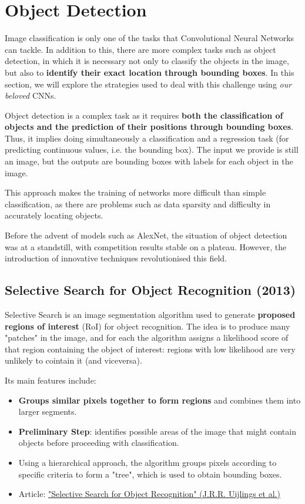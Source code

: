 \section{Object Detection}

Image classification is only one of the tasks that Convolutional Neural Networks can tackle. In addition to this, there are more complex tasks such as object detection, in which it is necessary not only to classify the objects in the image, but also to \textbf{identify their exact location through bounding boxes}. In this section, we will explore the strategies used to deal with this challenge using \textit{our beloved} CNNs.

Object detection is a complex task as it requires \textbf{both the classification of objects and the prediction of their positions through bounding boxes}. Thus, it implies doing simultaneously a classification and a regression task (for predicting continuous values, i.e. the bounding box). The input we provide is still an image, but the outputs are bounding boxes with labels for each object in the image. 

This approach makes the training of networks more difficult than simple classification, as there are problems such as data sparsity and difficulty in accurately locating objects. 

Before the advent of models such as AlexNet, the situation of object detection was at a standstill, with competition results stable on a plateau. However, the introduction of innovative techniques revolutionised this field.

\subsection{Selective Search for Object Recognition (2013)}
Selective Search is an image segmentation algorithm used to generate \textbf{proposed regions of interest} (RoI) for object recognition. The idea is to produce many "patches" in the image, and for each the algorithm assigns a likelihood score of that region containing the object of interest: regions with low likelihood are very unlikely to cointain it (and viceversa).

Its main features include:

\begin{itemize}
    \item \textbf{Groups similar pixels together to form regions} and combines them into larger segments.
    \item \textbf{Preliminary Step}: identifies possible areas of the image that might contain objects before proceeding with classification.
    \item Using a hierarchical approach, the algorithm groups pixels according to specific criteria to form a "tree", which is used to obtain bounding boxes.
    \item Article: \href{https://ivi.fnwi.uva.nl/isis/publications/2013/UijlingsIJCV2013/UijlingsIJCV2013.pdf}{"Selective Search for Object Recognition" (J.R.R. Uijlings et al.)}
\end{itemize}

